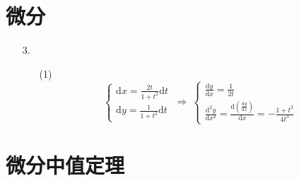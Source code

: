 \documentclass[11pt,oneside,fontset=fandol]{ctexbook} %
\begin{document}
\section{微分}

\begin{enumerate}
    \item[3.]
    \begin{enumerate}
        \item[(1)]
        \[
            \begin{cases}
                \mathrm dx = \frac{2t}{1+t^2} \mathrm dt \\
                \mathrm dy = \frac 1 {1+t^2} \mathrm dt
            \end{cases}
            \ \Rightarrow \
            \begin{cases}
                \frac{\mathrm dy}{\mathrm dx} = \frac 1 {2t} \\
                \frac{\mathrm d^2y}{\mathrm dx^2} = \frac{\mathrm d \left( \frac{\mathrm dy}{\mathrm dx} \right)}{\mathrm dx} = -\frac{1+t^2}{4t^3}
            \end{cases}
        \]
    \end{enumerate}
\end{enumerate}

\section{微分中值定理}
\end{document}
